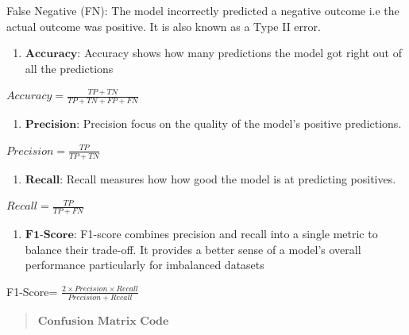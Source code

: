 \documentclass[11pt]{article}
\providecommand{\tightlist}{%
      \setlength{\itemsep}{0pt}\setlength{\parskip}{0pt}}
\begin{document}
    False Negative (FN): The model incorrectly predicted a negative outcome
i.e the actual outcome was positive. It is also known as a Type II
error.

    \begin{enumerate}
\def\labelenumi{\arabic{enumi}.}
\tightlist
\item
  \(\textbf{Accuracy:}\) Accuracy shows how many predictions the model
  got right out of all the predictions
\end{enumerate}

    \(Accuracy = \frac{TP + TN}{TP + TN + FP + FN}\)

    \begin{enumerate}
\def\labelenumi{\arabic{enumi}.}
\setcounter{enumi}{1}
\tightlist
\item
  \(\textbf{Precision:}\) Precision focus on the quality of the model's
  positive predictions.
\end{enumerate}

    \(Precision = \frac{TP}{TP + TN}\)

    \begin{enumerate}
\def\labelenumi{\arabic{enumi}.}
\setcounter{enumi}{2}
\tightlist
\item
  \(\textbf{Recall:}\) Recall measures how how good the model is at
  predicting positives.
\end{enumerate}

    \(Recall = \frac{TP}{TP + FN}\)

    \begin{enumerate}
\def\labelenumi{\arabic{enumi}.}
\setcounter{enumi}{3}
\tightlist
\item
  \(\textbf{F1-Score:}\) F1-score combines precision and recall into a
  single metric to balance their trade-off. It provides a better sense
  of a model's overall performance particularly for imbalanced datasets
\end{enumerate}

    F1-Score=
\(\frac{2 \times Precision \times Recall}{Precision + Recall}\)

    \begin{quote}
\(\textbf{Confusion Matrix Code}\)
\end{quote}
\end{document}
